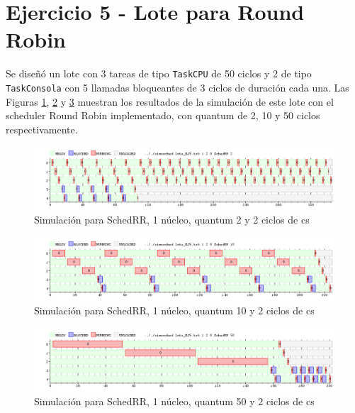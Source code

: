 \section{Ejercicio 5 - Lote para Round Robin}

Se diseñó un lote con 3 tareas de tipo {\tt TaskCPU} de 50 ciclos y 2 de tipo {\tt TaskConsola} con 5 llamadas bloqueantes de 3 ciclos de duración cada una.  Las Figuras \ref{fig-rrq2}, \ref{fig-rrq10} y \ref{fig-rrq50} muestran los resultados de la simulación de este lote con el scheduler Round Robin implementado, con quantum de 2, 10 y 50 ciclos respectivamente.

\begin{figure}[!htb]
\begin{center}
  \includegraphics[scale=0.45]{imagenes/ej5-q2.png}
\end{center}
\caption{Simulación para SchedRR, 1 núcleo, quantum 2 y 2 ciclos de cs}\label{fig-rrq2}
\end{figure}

\begin{figure}[!htb]
\begin{center}
  \includegraphics[scale=0.45]{imagenes/ej5-q10.png}
\end{center}
\caption{Simulación para SchedRR, 1 núcleo, quantum 10 y 2 ciclos de cs}\label{fig-rrq10}
\end{figure}

\begin{figure}[!htb]
\begin{center}
  \includegraphics[scale=0.45]{imagenes/ej5-q50.png}
\end{center}
\caption{Simulación para SchedRR, 1 núcleo, quantum 50 y 2 ciclos de cs}\label{fig-rrq50}
\end{figure}

